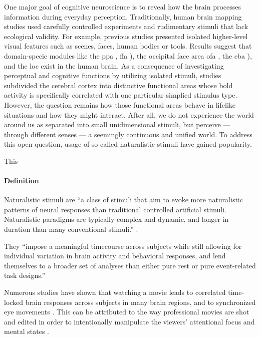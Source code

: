 One major goal of cognitive neuroscience is to reveal how the brain processes
information during everyday perception.
%
Traditionally, human brain mapping studies used carefully controlled experiments
and rudimentary stimuli that lack ecological validity.
%
For example, previous studies presented isolated higher-level visual features
such as scenes, faces, human bodies or tools.
%
Results suggest that domain-specic modules like the \ac{ppa}
\citep{epstein1998ppa}, \ac{ffa} \citep{kanwisher1997ffa}), the occipital face
area \ac{ofa} \citep{pitcher2011occipitalfacearea}, the \ac{eba}
\citep{downing2001bodyarea}), and the \ac{loc} \citet{malach1995loc} exist in
the human brain.
%
As a consequence of investigating perceptual and cognitive functions by
utilizing isolated stimuli, studies subdivided the cerebral cortex into
distinctive functional areas whose \ac{bold} activity is specifically correlated
with one particular simplied stimulus type.
%
However, the question remains how those functional areas behave in lifelike
situations and how they might interact.
%
After all, we do not experience the
world around us as separated into small unidimensional stimuli, but perceive ---
through different senses --- a seemingly continuous and unified world.
%
To address
this open question, usage of so called naturalistic stimuli have gained
popularity.


 This


\paragraph{Definition}


%
Naturalistic stimuli are ``a class of stimuli that aim to evoke more
naturalistic patterns of neural responses than traditional controlled artificial
stimuli. Naturalistic paradigms are typically complex and dynamic, and longer
in duration than many conventional stimuli.'' \citep{vanderwal2019movies}.

%
They ``impose a meaningful timecourse across subjects while still allowing for
individual variation in brain activity and behavioral responses, and lend
themselves to a broader set of analyses than either pure rest or pure
event-related task designs.'' \citep{finn2017can}

%
Numerous studies have shown that watching a movie leads to correlated
time-locked brain responses across subjects in many brain regions, and to
synchronized eye movements \citep{hasson2010reliability, lankinen2014isc-meg}.
%
This can be attributed to the way professional movies are shot and edited in
order to intentionally manipulate the viewers' attentional focus and mental
states \citep{brown2012cinematography, dancyger2011film-technique}.

